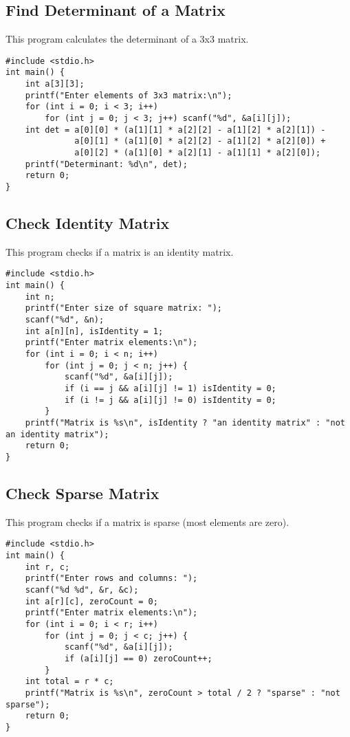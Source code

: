 \documentclass[a4paper,12pt]{article}
\begin{document}
\subsection{Find Determinant of a Matrix}
This program calculates the determinant of a 3x3 matrix.
\begin{lstlisting}[caption={Find Determinant of a Matrix}]
#include <stdio.h>
int main() {
    int a[3][3];
    printf("Enter elements of 3x3 matrix:\n");
    for (int i = 0; i < 3; i++)
        for (int j = 0; j < 3; j++) scanf("%d", &a[i][j]);
    int det = a[0][0] * (a[1][1] * a[2][2] - a[1][2] * a[2][1]) -
              a[0][1] * (a[1][0] * a[2][2] - a[1][2] * a[2][0]) +
              a[0][2] * (a[1][0] * a[2][1] - a[1][1] * a[2][0]);
    printf("Determinant: %d\n", det);
    return 0;
}
\end{lstlisting}
\clearpage

\subsection{Check Identity Matrix}
This program checks if a matrix is an identity matrix.
\begin{lstlisting}[caption={Check Identity Matrix}]
#include <stdio.h>
int main() {
    int n;
    printf("Enter size of square matrix: ");
    scanf("%d", &n);
    int a[n][n], isIdentity = 1;
    printf("Enter matrix elements:\n");
    for (int i = 0; i < n; i++)
        for (int j = 0; j < n; j++) {
            scanf("%d", &a[i][j]);
            if (i == j && a[i][j] != 1) isIdentity = 0;
            if (i != j && a[i][j] != 0) isIdentity = 0;
        }
    printf("Matrix is %s\n", isIdentity ? "an identity matrix" : "not an identity matrix");
    return 0;
}
\end{lstlisting}
\clearpage

\subsection{Check Sparse Matrix}
This program checks if a matrix is sparse (most elements are zero).
\begin{lstlisting}[caption={Check Sparse Matrix}]
#include <stdio.h>
int main() {
    int r, c;
    printf("Enter rows and columns: ");
    scanf("%d %d", &r, &c);
    int a[r][c], zeroCount = 0;
    printf("Enter matrix elements:\n");
    for (int i = 0; i < r; i++)
        for (int j = 0; j < c; j++) {
            scanf("%d", &a[i][j]);
            if (a[i][j] == 0) zeroCount++;
        }
    int total = r * c;
    printf("Matrix is %s\n", zeroCount > total / 2 ? "sparse" : "not sparse");
    return 0;
}
\end{lstlisting}
\clearpage
\end{document}
